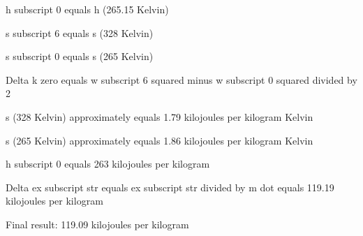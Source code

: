 h subscript 0 equals h (265.15 Kelvin)  

s subscript 6 equals s (328 Kelvin)  

s subscript 0 equals s (265 Kelvin)  

Delta k zero equals w subscript 6 squared minus w subscript 0 squared divided by 2  

s (328 Kelvin) approximately equals 1.79 kilojoules per kilogram Kelvin  

s (265 Kelvin) approximately equals 1.86 kilojoules per kilogram Kelvin  

h subscript 0 equals 263 kilojoules per kilogram  

Delta ex subscript str equals ex subscript str divided by m dot equals 119.19 kilojoules per kilogram  

Final result: 119.09 kilojoules per kilogram